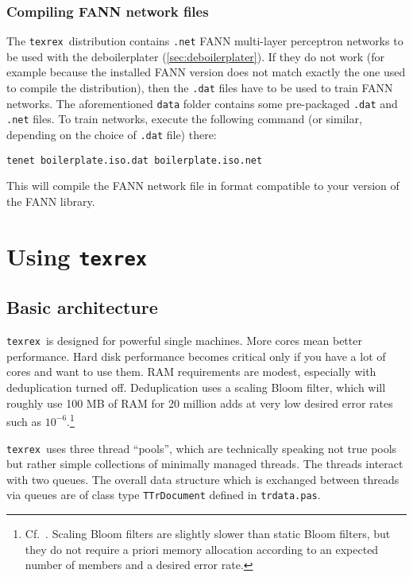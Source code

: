 \documentclass[12pt,a4paper]{article}
\newenvironment{bx}
{
  \begin{center}
  \begin{boxedminipage}[h]{0.9\textwidth}
  \small
}
{
  \end{boxedminipage}
  \end{center}
}
\newcommand{\trthis}{\texttt{texrex}}
\begin{document}
\subsubsection{Compiling FANN network files}

The \trthis\ distribution contains \texttt{.net} FANN multi-layer perceptron networks to be used with the deboilerplater (\ref{sec:deboilerplater}).
If they do not work (for example because the installed FANN version does not match exactly the one used to compile the distribution), then the \texttt{.dat} files have to be used to train FANN networks.
The aforementioned \texttt{data} folder contains some pre-packaged \texttt{.dat} and \texttt{.net} files.
To train networks, execute the following command (or similar, depending on the choice of \texttt{.dat} file) there:

\begin{bx}
\begin{verbatim}
tenet boilerplate.iso.dat boilerplate.iso.net
\end{verbatim}
\end{bx}

This will compile the FANN network file in format compatible to your version of the FANN library.

\section{Using \trthis}

\subsection{Basic architecture}

\trthis\ is designed for powerful single machines.
More cores mean better performance.
Hard disk performance becomes critical only if you have a lot of cores and want to use them.
RAM requirements are modest, especially with deduplication turned off.
Deduplication uses a scaling Bloom filter, which will roughly use 100 MB of RAM for 20 million adds at very low desired error rates such as $10^{-6}$.\footnote{Cf.\ \cite{Bloom1970,BroderMitzenmacher2004,AlmeidaEa2007}.
Scaling Bloom filters are slightly slower than static Bloom filters, but they do not require a priori memory allocation according to an expected number of members and a desired error rate.}

\trthis\ uses three thread ``pools'', which are technically speaking not true pools but rather simple collections of minimally managed threads.
The threads interact with two queues.
The overall data structure which is exchanged between threads via queues are of class type \texttt{TTrDocument} defined in \texttt{trdata.pas}.
\end{document}

